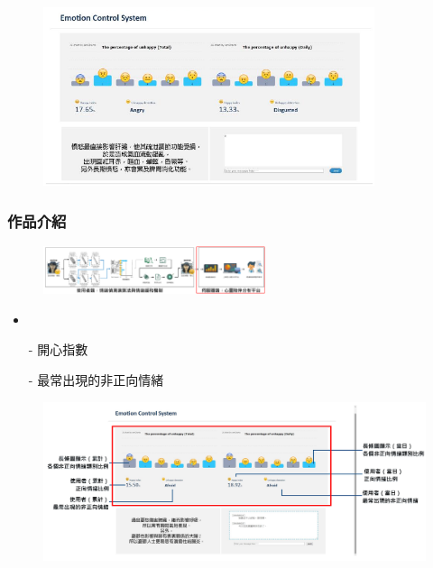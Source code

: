 \documentclass[10pt, conference, compsocconf]{beamer}
\begin{document}
\begin{CJK}{UTF8}{}
\begin{frame}
\begin{figure}[!t]
\begin{center}
\includegraphics[width=9.7cm]{./Figures/web.pdf}
\end{center}
\end{figure}

\end{frame}

\begin{frame}
\frametitle{作品介紹}

\vspace{-3mm}
\begin{figure}[t]
\begin{flushright}
\includegraphics[width=6.5cm]{./Figures/framework_version4_9.pdf}
\end{flushright}
\end{figure}

\vspace{-10mm}
\begin{itemize}
\item {}
\end{itemize}
\begin{itemize}
\item[-]  開心指數
\item[-]  最常出現的非正向情緒
\end{itemize}
\vspace{-3mm}
\begin{figure}[!t]
\begin{center}
\includegraphics[width=12cm]{./Figures/web6.pdf}
\end{center}
\end{figure}


\end{frame}
\end{CJK}
\end{document}
